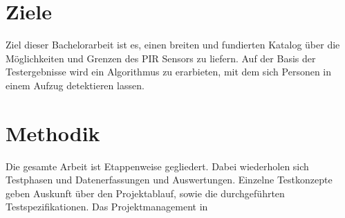  
\section{Ziele}
\label{sec:Einleitung}
Ziel dieser Bachelorarbeit ist es, einen breiten und fundierten Katalog über die Möglichkeiten und Grenzen des PIR Sensors zu liefern. Auf der Basis der Testergebnisse wird ein Algorithmus zu erarbieten, mit dem sich Personen in einem Aufzug detektieren lassen. 

\section{Methodik}
\label{sec:Methodik}
Die gesamte Arbeit ist Etappenweise gegliedert. Dabei wiederholen sich Testphasen und Datenerfassungen und Auswertungen. Einzelne Testkonzepte geben Auskunft über den Projektablauf, sowie die durchgeführten Testspezifikationen. Das Projektmanagement in  
